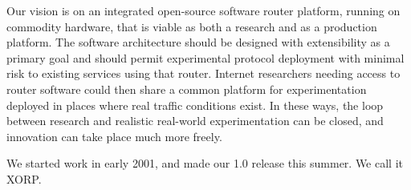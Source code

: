 Our vision is on an integrated open-source software router platform,
running on commodity hardware, that is viable as both a research and as a
production platform.  The software architecture should be designed
with extensibility as a primary goal and should permit experimental
protocol deployment with minimal risk to existing services using that
router.  Internet researchers needing access to router software could
then share a common platform for experimentation deployed in places
where real traffic conditions exist.  In these ways, the loop
between research and realistic real-world experimentation can be
closed, and innovation can take place much more freely.

We started work in early 2001, and made our 1.0 release this summer.
We call it XORP.


